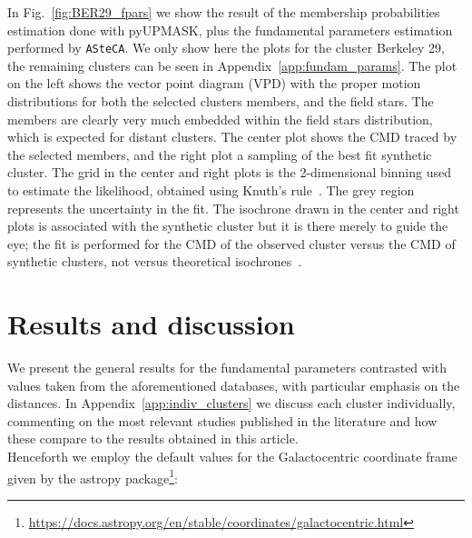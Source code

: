 \documentclass{aa}
\begin{document}
  In Fig.~\ref{fig:BER29_fpars} we show the result of the membership
  probabilities estimation done with pyUPMASK, plus the fundamental parameters
  estimation performed by \texttt{ASteCA}. We only show here the plots for
  the cluster Berkeley 29, the remaining clusters can be seen in
  Appendix~\ref{app:fundam_params}.
  The plot on the left shows the vector point diagram (VPD) with the proper
  motion distributions for both the selected clusters members, and the field
  stars. The members are clearly very much embedded within the field stars
  distribution, which is expected for distant clusters. The center plot shows
  the CMD traced by the selected members, and the right plot a sampling of the
  best fit synthetic cluster. The grid in the center and right plots is
  the 2-dimensional binning used to estimate the likelihood, obtained using
  Knuth's rule~\citep{Knuth_2006}. The grey region represents the uncertainty
  in the fit. The isochrone drawn in the center and right plots is associated
  with the synthetic cluster but it is there merely to guide the eye; the fit is
  performed for the CMD of the observed cluster versus the CMD of synthetic
  clusters, not versus theoretical isochrones~\citep[this is further
  explained in:][]{Perren_2015,Perren_2017,Perren_2020}.\\








\section{Results and discussion}
 \label{sec:results}

 We present the general results for the
 fundamental parameters contrasted with values taken from the
 aforementioned databases, with particular emphasis on the distances.
 In Appendix~\ref{app:indiv_clusters} we discuss each cluster
 individually, commenting on the most relevant studies published in the
 literature and how these compare to the results obtained in this article.\\

 Henceforth we employ the default values for the Galactocentric coordinate
 frame given by the astropy
 package\footnote{\url{https://docs.astropy.org/en/stable/coordinates/galactocentric.html}}:
\end{document}
